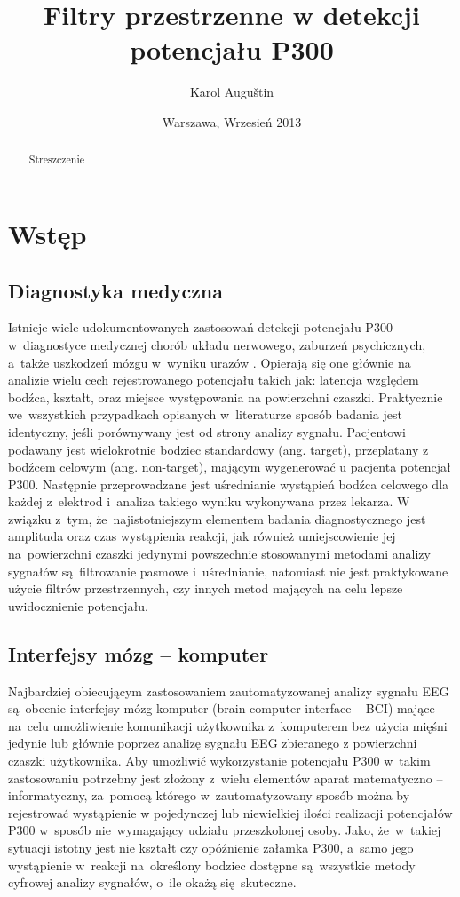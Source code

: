 \documentclass[licencjacka,openright]{pracamgr}
\author{ Karol Auguštin }
\title{ Filtry przestrzenne w detekcji potencjału P300 }
\date{Warszawa, Wrzesień 2013}
\begin{document}
\let\cleardoublepage\clearpage
\maketitle
\begin{abstract}
\par Streszczenie
\end{abstract}
\tableofcontents

\chapter{Wstęp}
\section{Diagnostyka medyczna}
Istnieje wiele udokumentowanych zastosowań detekcji potencjału P300 w~diagnostyce medycznej chorób układu nerwowego, zaburzeń psychicznych, a~także uszkodzeń mózgu w~wyniku urazów \cite{zgorzalewicz2000}. Opierają się one głównie na analizie wielu cech rejestrowanego potencjału takich jak: latencja względem bodźca, kształt, oraz miejsce występowania na powierzchni czaszki. Praktycznie we~wszystkich przypadkach opisanych w~literaturze sposób badania jest identyczny, jeśli porównywany jest od strony analizy sygnału. Pacjentowi podawany jest wielokrotnie bodziec standardowy (ang. target), przeplatany z bodźcem celowym (ang. non-target), mającym wygenerować u pacjenta potencjał P300. Następnie przeprowadzane jest uśrednianie wystąpień bodźca celowego dla każdej z~elektrod i~analiza takiego wyniku wykonywana przez lekarza. 
W związku z~tym, że~najistotniejszym elementem badania diagnostycznego jest amplituda oraz czas wystąpienia reakcji, jak również umiejscowienie jej na~powierzchni czaszki  jedynymi powszechnie stosowanymi metodami analizy sygnałów są~filtrowanie pasmowe i~uśrednianie, natomiast nie jest praktykowane użycie filtrów przestrzennych, czy innych metod mających na celu lepsze uwidocznienie potencjału.
\section{Interfejsy mózg -- komputer}
Najbardziej obiecującym zastosowaniem zautomatyzowanej analizy sygnału EEG są~obecnie interfejsy mózg-komputer (brain-computer interface -- BCI) mające na~celu umożliwienie komunikacji użytkownika z~komputerem bez użycia mięśni jedynie lub głównie poprzez analizę sygnału EEG zbieranego z powierzchni czaszki użytkownika. Aby umożliwić wykorzystanie potencjału P300 w~takim zastosowaniu potrzebny jest złożony z~wielu elementów aparat matematyczno -- informatyczny, za~pomocą którego w~zautomatyzowany sposób można by rejestrować wystąpienie w pojedynczej lub niewielkiej ilości realizacji potencjałów P300 w~sposób nie~wymagający udziału przeszkolonej osoby. Jako, że~w~takiej sytuacji istotny jest nie kształt czy opóźnienie załamka P300, a~samo jego wystąpienie w~reakcji na~określony bodziec dostępne są~wszystkie metody cyfrowej analizy sygnałów, o~ile okażą się~skuteczne.
\end{document}
